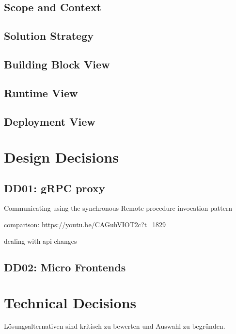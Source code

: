 \subsection{Scope and Context}

\subsection{Solution Strategy}

\subsection{Building Block View}

\subsection{Runtime View}

\subsection{Deployment View}

\section{Design Decisions}

\subsection{DD01: gRPC proxy}

Communicating using the synchronous Remote
procedure invocation pattern \citep{richardson2018microservices}

comparison: https://youtu.be/CAGuhVIOT2c?t=1829

dealing with api changes

\subsection{DD02: Micro Frontends}

\section{Technical Decisions}

Lösungsalternativen sind kritisch zu bewerten und Auswahl zu begründen.